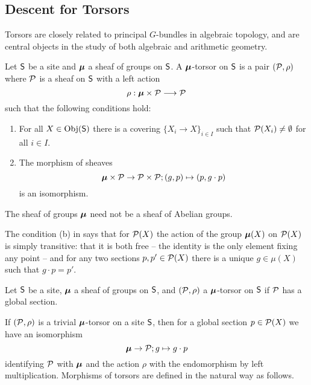 \subsection{Descent for Torsors}\label{subsec: descent for torsors}
Torsors are closely related to principal $G$-bundles in algebraic topology, and are central objects in the study of both algebraic and arithmetic geometry. 
\begin{definition}[Torsor]\label{def: torsor}
    Let $\mathsf{S}$ be a site and $\bm{\mu}$ a sheaf of groups on $\mathsf{S}$. A $\bm{\mu}$-torsor on $\mathsf{S}$ is a pair $(\mathcal{P},\rho)$ where $\mathcal{P}$ is a sheaf on $\mathsf{S}$ with a left action 
    $$\rho:\bm{\mu}\times\mathcal{P}\longrightarrow\mathcal{P}$$
    such that the following conditions hold:
    \begin{enumerate}
        \item For all $X\in\mathrm{Obj}(\mathsf{S})$ there is a covering $\{X_{i}\to X\}_{i\in I}$ such that $\mathcal{P}(X_{i})\neq\emptyset$ for all $i\in I$.
        \item The morphism of sheaves
        $$\bm{\mu}\times\mathcal{P}\to\mathcal{P}\times\mathcal{P}; (g,p)\mapsto(p,g\cdot p)$$
        is an isomorphism. 
    \end{enumerate}
\end{definition}
\begin{remark}
    The sheaf of groups $\bm{\mu}$ need not be a sheaf of Abelian groups. 
\end{remark}
\begin{remark}
    The condition (b) in  says that for $\mathcal{P}(X)$ the action of the group $\bm{\mu}(X)$ on $\mathcal{P}(X)$ is simply transitive: that it is both free -- the identity is the only element fixing any point -- and for any two sections $p,p'\in\mathcal{P}(X)$ there is a unique $g\in \mu(X)$ such that $g\cdot p=p'$. 
\end{remark}
\begin{definition}\label{def: trivial torsor}
    Let $\mathsf{S}$ be a site, $\bm{\mu}$ a sheaf of groups on $\mathsf{S}$, and $(\mathcal{P},\rho)$ a $\bm{\mu}$-torsor on $\mathsf{S}$ if $\mathcal{P}$ has a global section. 
\end{definition}
If $(\mathcal{P},\rho)$ is a trivial $\bm{\mu}$-torsor on a site $\mathsf{S}$, then for a global section $p\in\mathcal{P}(X)$ we have an isomorphism 
$$\bm{\mu}\to\mathcal{P}; g\mapsto g\cdot p$$
identifying $\mathcal{P}$ with $\bm{\mu}$ and the action $\rho$ with the endomorphism by left multiplication. Morphisms of torsors are defined in the natural way as follows. 
